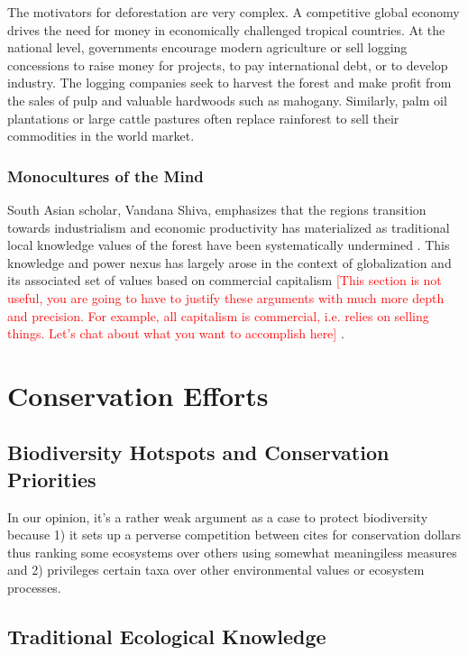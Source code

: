 The motivators for deforestation are very complex. A competitive global economy drives the need for money in economically challenged tropical countries. At the national level, governments encourage modern agriculture or sell logging concessions to raise money for projects, to pay international debt, or to develop industry. The logging companies seek to harvest the forest and make profit from the sales of pulp and valuable hardwoods such as mahogany. Similarly, palm oil plantations or large cattle pastures often replace rainforest to sell their commodities in the world market. 

\subsubsection{Monocultures of the Mind}
South Asian scholar, Vandana Shiva, emphasizes that the regions transition towards industrialism and economic productivity has materialized as traditional local knowledge values of the forest have been systematically undermined \citep{shiva1993monocultures}. This knowledge and power nexus has largely arose in the context of globalization and its associated set of values based on commercial capitalism \textcolor{red}{[This section is not useful, you are going to have to justify these arguments with much more depth and precision. For example, all capitalism is commercial, i.e. relies on selling things. Let's chat about what you want to accomplish here]} \citealp{king1993politik}.

\section{Conservation Efforts}

\subsection{Biodiversity Hotspots and Conservation Priorities}  

In our opinion, it's a rather weak argument as a case to protect biodiversity because 1) it sets up a perverse competition between cites for conservation dollars thus ranking some ecosystems over others using somewhat meaningiless measures and 2) privileges certain taxa over other environmental values or ecosystem processes.

\subsection{Traditional Ecological Knowledge}


